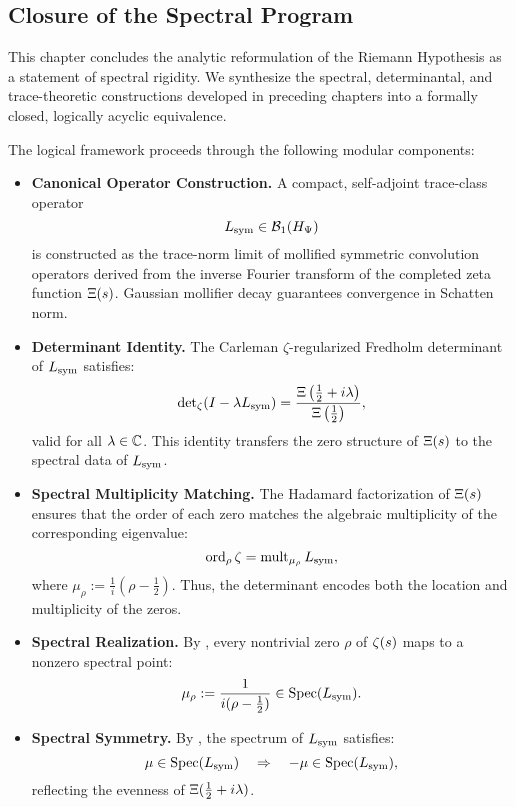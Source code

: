 \subsection*{Closure of the Spectral Program}

This chapter concludes the analytic reformulation of the Riemann Hypothesis as a statement of spectral rigidity. We synthesize the spectral, determinantal, and trace-theoretic constructions developed in preceding chapters into a formally closed, logically acyclic equivalence.

\medskip
\noindent
The logical framework proceeds through the following modular components:

\begin{itemize}
  \item \textbf{Canonical Operator Construction.}  
  A compact, self-adjoint trace-class operator
  \[
  L_{\mathrm{sym}} \in \mathcal{B}_1(H_{\Psi})
  \]
  is constructed as the trace-norm limit of mollified symmetric convolution operators derived from the inverse Fourier transform of the completed zeta function \( \Xi(s) \). Gaussian mollifier decay guarantees convergence in Schatten norm.

  \item \textbf{Determinant Identity.}  
  The Carleman \(\zeta\)-regularized Fredholm determinant of \( L_{\mathrm{sym}} \) satisfies:
  \[
  \det\nolimits_\zeta(I - \lambda L_{\mathrm{sym}}) = \frac{\Xi\left(\tfrac{1}{2} + i\lambda\right)}{\Xi\left(\tfrac{1}{2}\right)},
  \]
  valid for all \( \lambda \in \mathbb{C} \). This identity transfers the zero structure of \( \Xi(s) \) to the spectral data of \( L_{\mathrm{sym}} \).

  \item \textbf{Spectral Multiplicity Matching.}  
  The Hadamard factorization of \( \Xi(s) \) ensures that the order of each zero matches the algebraic multiplicity of the corresponding eigenvalue:
  \[
  \operatorname{ord}_{\rho} \zeta = \operatorname{mult}_{\mu_\rho} L_{\mathrm{sym}},
  \]
  where \( \mu_\rho := \frac{1}{i}(\rho - \tfrac{1}{2}) \). Thus, the determinant encodes both the location and multiplicity of the zeros.

  \item \textbf{Spectral Realization.}  
  By , every nontrivial zero \( \rho \) of \( \zeta(s) \) maps to a nonzero spectral point:
  \[
  \mu_\rho := \frac{1}{i(\rho - \tfrac{1}{2})} \in \operatorname{Spec}(L_{\mathrm{sym}}).
  \]

  \item \textbf{Spectral Symmetry.}  
  By , the spectrum of \( L_{\mathrm{sym}} \) satisfies:
  \[
  \mu \in \operatorname{Spec}(L_{\mathrm{sym}}) \quad \Rightarrow \quad -\mu \in \operatorname{Spec}(L_{\mathrm{sym}}),
  \]
  reflecting the evenness of \( \Xi(\tfrac{1}{2} + i\lambda) \).


\end{itemize}
